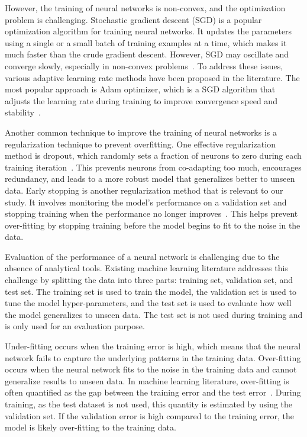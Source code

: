 However, the training of neural networks is non-convex, and the optimization problem is challenging.
Stochastic gradient descent (SGD) is a popular optimization algorithm for training neural networks.
It updates the parameters using a single or a small batch of training examples at a time, which makes it much faster than the crude gradient descent.
However, SGD may oscillate and converge slowly, especially in non-convex problems~\citep{bengio2016}.
To address these issues, various adaptive learning rate methods have been proposed in the literature.
The most popular approach is Adam optimizer, which is a SGD algorithm that adjusts the learning rate during training to improve convergence speed and stability~\citep{kingma2014adam}.

Another common technique to improve the training of neural networks is a regularization technique to prevent overfitting.
One effective regularization method is dropout, which randomly sets a fraction of neurons to zero during each training iteration~\citep{srivastava2014dropout}.
This prevents neurons from co-adapting too much, encourages redundancy, and leads to a more robust model that generalizes better to unseen data.
Early stopping is another regularization method that is relevant to our study.
It involves monitoring the model's performance on a validation set and stopping training when the performance no longer improves~\citep{prechelt2002early}.
This helps prevent over-fitting by stopping training before the model begins to fit to the noise in the data.

Evaluation of the performance of a neural network is challenging due to the absence of analytical tools.
Existing machine learning literature addresses this challenge by splitting the data into three parts: training set, validation set, and test set.
The training set is used to train the model, the validation set is used to tune the model hyper-parameters, and the test set is used to evaluate how well the model generalizes to unseen data.
The test set is not used during training and is only used for an evaluation purpose.

Under-fitting occurs when the training error is high, which means that the neural network fails to capture the underlying patterns in the training data.
Over-fitting occurs when the neural network fits to the noise in the training data and cannot generalize results to unseen data.
In machine learning literature, over-fitting is often quantified as the gap between the training error and the test error~\citep{bishop2006pattern}.
During training, as the test dataset is not used, this quantity is estimated by using the validation set.
If the validation error is high compared to the training error, the model is likely over-fitting to the training data.

